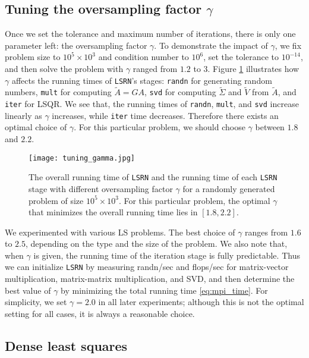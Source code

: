 \documentclass{siamltex}
\begin{document}
\subsection{Tuning the oversampling factor $\gamma$}
\label{sec:tuning-parameters}

Once we set the tolerance and maximum number of iterations, there is only one
parameter left: the oversampling factor $\gamma$. To demonstrate the impact of
$\gamma$, we fix problem size to $10^5 \times 10^3$ and condition number to
$10^6$, set the tolerance to $10^{-14}$, and then solve the problem with
$\gamma$ ranged from $1.2$ to $3$. Figure \ref{fig:tuning-s} illustrates how
$\gamma$ affects the running times of \texttt{LSRN}'s stages: \texttt{randn} for
generating random numbers, \texttt{mult} for computing $\tilde{A} = G A$,
\texttt{svd} for computing $\tilde{\Sigma}$ and $\tilde{V}$ from $\tilde{A}$,
and \texttt{iter} for LSQR. We see that, the running times of \texttt{randn},
\texttt{mult}, and \texttt{svd} increase linearly as $\gamma$ increases, while
\texttt{iter} time decreases. Therefore there exists an optimal choice of
$\gamma$. For this particular problem, we should choose $\gamma$ between $1.8$
and $2.2$.
\begin{figure}
  \centering
  \texttt{[image: tuning\_gamma.jpg]}
  \caption{The overall running time of \texttt{LSRN} and the running time of
    each \texttt{LSRN} stage with different oversampling factor $\gamma$ for a
    randomly generated problem of size $10^5 \times 10^3$. For this particular
    problem, the optimal $\gamma$ that minimizes the overall running time lies
    in $[1.8, 2.2]$.}
  \label{fig:tuning-s}
\end{figure}
We experimented with various LS problems.  The best choice of $\gamma$ ranges
from $1.6$ to $2.5$, depending on the type and the size of the problem. We also
note that, when $\gamma$ is given, the running time of the iteration stage is
fully predictable. Thus we can initialize \texttt{LSRN} by measuring randn/sec
and flops/sec for matrix-vector multiplication, matrix-matrix multiplication,
and SVD, and then determine the best value of $\gamma$ by minimizing the total
running time \eqref{eq:mpi_time}.  For simplicity, we set $\gamma = 2.0$ in all
later experiments; although this is not the optimal setting for all cases, it is
always a reasonable choice.

\subsection{Dense least squares}
\label{sec:dense-lsq}
\end{document}
